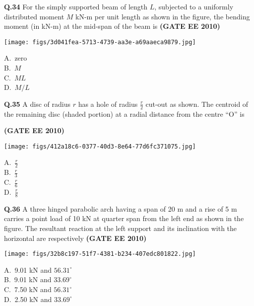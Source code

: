 \documentclass[journal,12pt,onecolumn]{exam}
\theoremstyle{remark}
\begin{document}
\noindent\textbf{Q.34} For the simply supported beam of length $L$, subjected to a uniformly distributed moment $M$ kN-m per unit length as shown in the figure, the bending moment (in kN-m) at the mid-span of the beam is
\hfill\textbf{(GATE EE 2010)}
\begin{center}
\texttt{[image: figs/3d041fea-5713-4739-aa3e-a69aaeca9879.jpg]}
\end{center}
\begin{multicols}{4}
A.\ zero \\
B.\ $M$ \\
C.\ $ML$ \\
D.\ $M/L$
\end{multicols}

\noindent\textbf{Q.35} A disc of radius $r$ has a hole of radius $\frac{r}{2}$ cut-out as shown. The centroid of the remaining disc (shaded portion) at a radial distance from the centre “O” is

\hfill\textbf{(GATE EE 2010)}
\begin{center}
\texttt{[image: figs/412a18c6-0377-40d3-8e64-77d6fc371075.jpg]}
\end{center}

\begin{multicols}{4}
A.\ $\frac{r}{2}$ \\
B.\ $\frac{r}{3}$ \\
C.\ $\frac{r}{6}$ \\
D.\ $\frac{r}{8}$
\end{multicols}


\noindent\textbf{Q.36} A three hinged parabolic arch having a span of 20 m and a rise of 5 m carries a point load of 10 kN at quarter span from the left end as shown in the figure. The resultant reaction at the left support and its inclination with the horizontal are respectively
\hfill\textbf{(GATE EE 2010)}
\begin{center}
    
\texttt{[image: figs/32b8c197-51f7-4381-b234-407edc801822.jpg]}
\end{center}
\begin{multicols}{4}
A.\ 9.01 kN and $56.31^\circ$ \\
B.\ 9.01 kN and $33.69^\circ$ \\
C.\ 7.50 kN and $56.31^\circ$ \\
D.\ 2.50 kN and $33.69^\circ$
\end{multicols}
\end{document}
